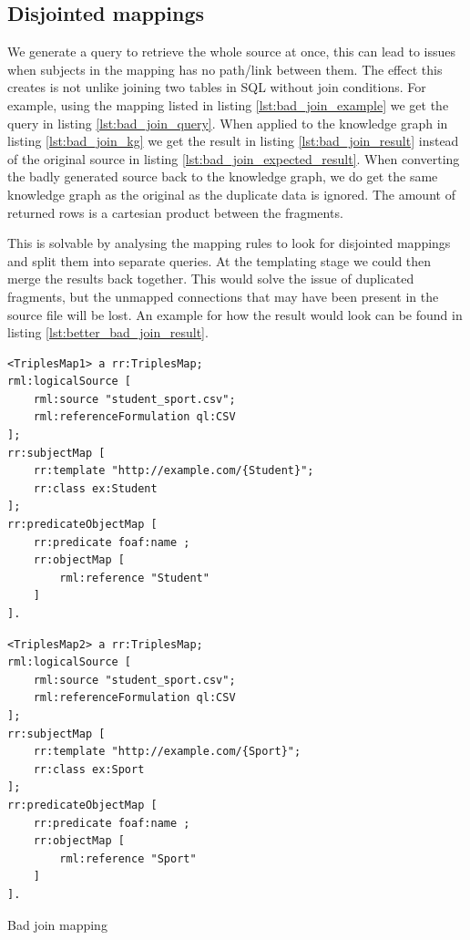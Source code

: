 \subsection{Disjointed mappings}
\label{subsection:disjointed_mappings}

We generate a query to retrieve the whole source at once, this can lead to issues when subjects in the mapping has no path/link between them. The effect this creates is not unlike joining two tables in SQL without join conditions. For example, using the mapping listed in listing \ref{lst:bad_join_example} we get the query in listing \ref{lst:bad_join_query}. When applied to the knowledge graph in listing \ref{lst:bad_join_kg} we get the result in listing \ref{lst:bad_join_result} instead of the original source in listing \ref{lst:bad_join_expected_result}. When converting the badly generated source back to the knowledge graph, we do get the same knowledge graph as the original as the duplicate data is ignored. The amount of returned rows is a cartesian product between the fragments. 

This is solvable by analysing the mapping rules to look for disjointed mappings and split them into separate queries. At the templating stage we could then merge the results back together. This would solve the issue of duplicated fragments, but the unmapped connections that may have been present in the source file will be lost. An example for how the result would look can be found in listing \ref{lst:better_bad_join_result}.

\begin{listing}
    \noindent\begin{minipage}[b]{.45\textwidth}
        \begin{lstlisting}[basicstyle=\small]
<TriplesMap1> a rr:TriplesMap;
rml:logicalSource [ 
    rml:source "student_sport.csv";
    rml:referenceFormulation ql:CSV
];
rr:subjectMap [ 
    rr:template "http://example.com/{Student}";
    rr:class ex:Student
];
rr:predicateObjectMap [ 
    rr:predicate foaf:name ; 
    rr:objectMap [ 
        rml:reference "Student"
    ]
].
        \end{lstlisting}      
    \end{minipage}
    \hfill
    \begin{minipage}[b]{.45\textwidth}
        \begin{lstlisting}[basicstyle=\small]
<TriplesMap2> a rr:TriplesMap;
rml:logicalSource [ 
    rml:source "student_sport.csv";
    rml:referenceFormulation ql:CSV
];
rr:subjectMap [ 
    rr:template "http://example.com/{Sport}";
    rr:class ex:Sport
];
rr:predicateObjectMap [ 
    rr:predicate foaf:name ; 
    rr:objectMap [ 
        rml:reference "Sport"
    ]
].
        \end{lstlisting}
    \end{minipage}
    \addtocounter{listing}{5}
    \caption{Bad join mapping}
    \label{lst:bad_join_example}
\end{listing}

